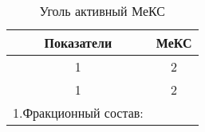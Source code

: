 
\begin{center}
\small
\begin{longtable}{m{12cm}c}
\caption{Уголь активный МеКС}
\label{tabular:meks} \\
\hline
\multicolumn{1}{c}{Показатели}&МеКС\\
\hline
\multicolumn{1}{c}{1}&\multicolumn{1}{c}{2}\\
\hline \endfirsthead%
\hline
\multicolumn{1}{c}{1}&\multicolumn{1}{c}{2}\\
\hline \endhead
1.Фракционный состав:&\\


\hline
\end{longtable}
\end{center}